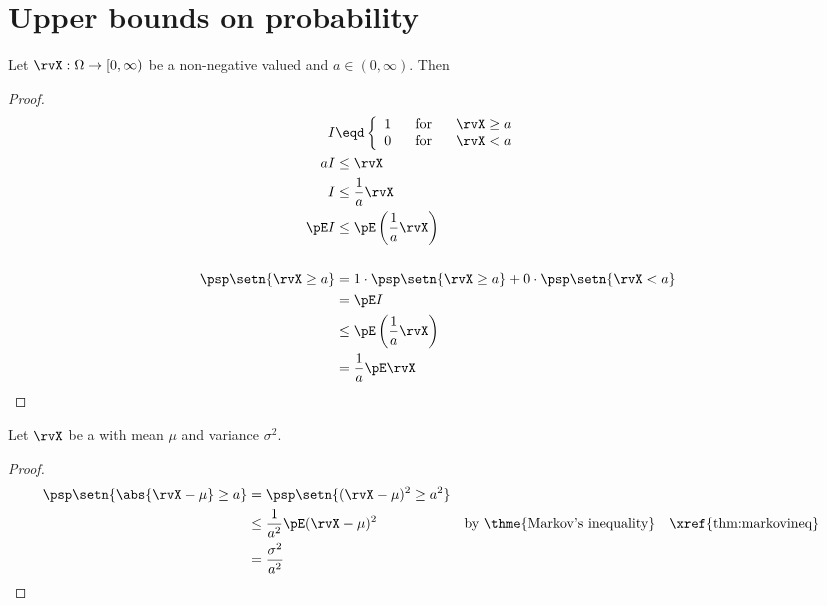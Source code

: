 \section{Upper bounds on probability}
\begin{theorem}
\label{thm:markovineq}
Let $\rvX:\Omega\to[0,\infty)$ be a non-negative valued  and
$a\in(0,\infty)$. Then
\end{theorem}
\begin{proof}
\begin{align*}
  I &\eqd \left\{ \begin{array}{l@{\hspace{4ex}\mbox{for}\hspace{4ex}}l}
    1 &\rvX\ge a \\
    0 &\rvX < a
    \end{array}\right.
\\
  aI &\le\rvX           \\
   I &\le \frac{1}{a}\rvX \\
   \pE I &\le \pE\left(\frac{1}{a}\rvX\right) \\
\\
   \psp\setn{\rvX\ge a}
     &= 1\cdot\psp\setn{\rvX\ge a} + 0\cdot\psp\setn{\rvX<a}
   \\&= \pE I
   \\&\le \pE\left(\frac{1}{a}\rvX \right)
   \\&=   \frac{1}{a}\pE\rvX
\end{align*}
\end{proof}


\begin{theorem}
Let $\rvX$ be a  with mean $\mu$ and variance $\sigma^2$.
\end{theorem}
\begin{proof}
\begin{align*}
  \psp\setn{\abs{\rvX-\mu} \ge a}
    &=   \psp\setn{ (\rvX-\mu)^2 \ge a^2}
  \\&\le \frac{1}{a^2} \pE(\rvX-\mu)^2 
    && \text{by \thme{Markov's inequality}}
    && \text{\xref{thm:markovineq}}
  \\&=   \frac{\sigma^2}{a^2}
\end{align*}
\end{proof}

